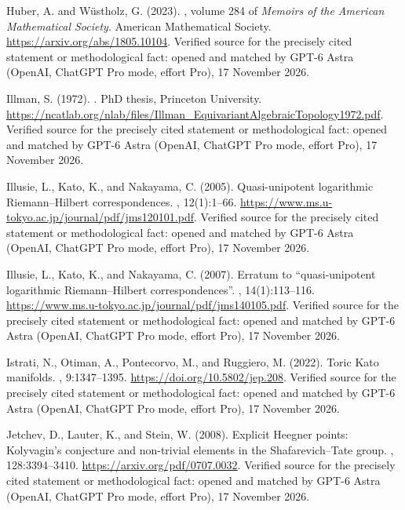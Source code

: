 \begin{thebibliography}{}
Huber, A. and W{\"u}stholz, G. (2023).
, volume 284 of
  {\em Memoirs of the American Mathematical Society}.
\newblock American Mathematical Society.
\newblock \url{https://arxiv.org/abs/1805.10104}. Verified source for the precisely cited statement or methodological fact: opened and matched by GPT-6 Astra (OpenAI, ChatGPT Pro mode, effort Pro), 17 November 2026.

Illman, S. (1972).
.
\newblock PhD thesis, Princeton University.
\newblock \url{https://ncatlab.org/nlab/files/Illman_EquivariantAlgebraicTopology1972.pdf}. Verified source for the precisely cited statement or methodological fact: opened and matched by GPT-6 Astra (OpenAI, ChatGPT Pro mode, effort Pro), 17 November 2026.

Illusie, L., Kato, K., and Nakayama, C. (2005).
\newblock Quasi-unipotent logarithmic {Riemann--Hilbert} correspondences.
,
  12(1):1--66.
\newblock \url{https://www.ms.u-tokyo.ac.jp/journal/pdf/jms120101.pdf}. Verified source for the precisely cited statement or methodological fact: opened and matched by GPT-6 Astra (OpenAI, ChatGPT Pro mode, effort Pro), 17 November 2026.

Illusie, L., Kato, K., and Nakayama, C. (2007).
\newblock Erratum to ``quasi-unipotent logarithmic {Riemann--Hilbert}
  correspondences''.
,
  14(1):113--116.
\newblock \url{https://www.ms.u-tokyo.ac.jp/journal/pdf/jms140105.pdf}. Verified source for the precisely cited statement or methodological fact: opened and matched by GPT-6 Astra (OpenAI, ChatGPT Pro mode, effort Pro), 17 November 2026.

Istrati, N., Otiman, A., Pontecorvo, M., and Ruggiero, M. (2022).
\newblock Toric {Kato} manifolds.
,
  9:1347--1395.
\newblock \url{https://doi.org/10.5802/jep.208}. Verified source for the precisely cited statement or methodological fact: opened and matched by GPT-6 Astra (OpenAI, ChatGPT Pro mode, effort Pro), 17 November 2026.

Jetchev, D., Lauter, K., and Stein, W. (2008).
\newblock Explicit {H}eegner points: {K}olyvagin's conjecture and non-trivial
  elements in the {S}hafarevich--{T}ate group.
, 128:3394--3410.
\newblock \url{https://arxiv.org/pdf/0707.0032}. Verified source for the precisely cited statement or methodological fact: opened and matched by GPT-6 Astra (OpenAI, ChatGPT Pro mode, effort Pro), 17 November 2026.


\end{thebibliography}
